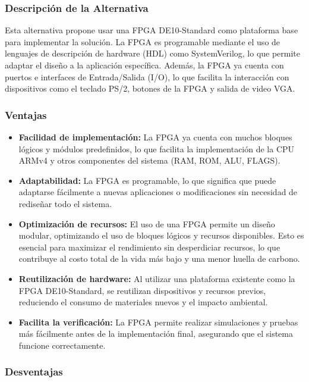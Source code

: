 \documentclass[conference]{IEEEtran}
\begin{document}
\subsubsection*{Descripción de la Alternativa}

Esta alternativa propone usar una FPGA DE10-Standard como plataforma base para implementar la solución. La FPGA es programable mediante el uso de lenguajes de descripción de hardware (HDL) como SystemVerilog, lo que permite adaptar el diseño a la aplicación específica. Además, la FPGA ya cuenta con puertos e interfaces de Entrada/Salida (I/O), lo que facilita la interacción con dispositivos como el teclado PS/2, botones de la FPGA y salida de video VGA.

\subsubsection*{Ventajas}

\begin{itemize}
	\item \textbf{Facilidad de implementación:} La FPGA ya cuenta con muchos bloques lógicos y módulos predefinidos, lo que facilita la implementación de la CPU ARMv4 y otros componentes del sistema (RAM, ROM, ALU, FLAGS).
	\item \textbf{Adaptabilidad:} La FPGA es programable, lo que significa que puede adaptarse fácilmente a nuevas aplicaciones o modificaciones sin necesidad de rediseñar todo el sistema.
	\item \textbf{Optimización de recursos:} El uso de una FPGA permite un diseño modular, optimizando el uso de bloques lógicos y recursos disponibles. Esto es esencial para maximizar el rendimiento sin desperdiciar recursos, lo que contribuye al costo total de la vida más bajo y una menor huella de carbono.
	\item \textbf{Reutilización de hardware:} Al utilizar una plataforma existente como la FPGA DE10-Standard, se reutilizan dispositivos y recursos previos, reduciendo el consumo de materiales nuevos y el impacto ambiental.
	\item \textbf{Facilita la verificación:} La FPGA permite realizar simulaciones y pruebas más fácilmente antes de la implementación final, asegurando que el sistema funcione correctamente.
\end{itemize}

\subsubsection*{Desventajas}
\end{document}
